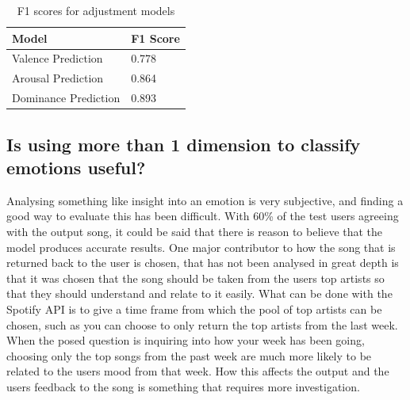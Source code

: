 \begin{table}[h]
\centering
\caption{F1 scores for adjustment models}
\begin{tabular}{|l|l|}
\hline
Model & F1 Score \\ \hline
 Valence Prediction &  0.778\\
 Arousal Prediction &  0.864\\
 Dominance Prediction &  0.893\\
 \hline
\end{tabular}
\label{f1:adj}
\end{table}

\subsection{Is using more than 1 dimension to classify emotions useful?}

Analysing something like insight into an emotion is very subjective, and finding a good way to evaluate this has been difficult. With 60\% of the test users agreeing with the output song, it could be said that there is reason to believe that the model produces accurate results. One major contributor to how the song that is returned back to the user is chosen, that has not been analysed in great depth is that it was chosen that the song should be taken from the users top artists so that they should understand and relate to it easily. What can be done with the Spotify API is to give a time frame from which the pool of top artists can be chosen, such as you can choose to only return the top artists from the last week. When the posed question is inquiring into how your week has been going, choosing only the top songs from the past week are much more likely to be related to the users mood from that week. How this affects the output and the users feedback to the song is something that requires more investigation. 

